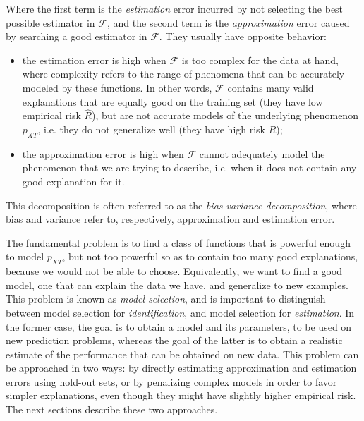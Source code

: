 \documentclass[12pt]{book}
\begin{document}
Where the first term is the \emph{estimation} error incurred by not selecting the best possible estimator in $\mathcal{F}$, and the second term is the \emph{approximation} error caused by searching a good estimator in $\mathcal{F}$. They usually have opposite behavior:

\begin{itemize}
\item the estimation error is high when $\mathcal{F}$ is too complex for the data at hand, where complexity refers to the range of phenomena that can be accurately modeled by these functions. In other words, $\mathcal{F}$ contains many valid explanations that are equally good on the training set (they have low empirical risk $\hat{R}$), but are not accurate models of the underlying phenomenon $p_{XT}$, i.e. they do not generalize well (they have high risk $R$);
\item the approximation error is high when $\mathcal{F}$ cannot adequately model the phenomenon that we are trying to describe, i.e. when it does not contain any good explanation for it.
\end{itemize}

This decomposition is often referred to as the \emph{bias-variance decomposition}, where bias and variance refer to, respectively, approximation and estimation error.

The fundamental problem is to find a class of functions that is powerful enough to model $p_{XT}$, but not too powerful so as to contain too many good explanations, because we would not be able to choose. Equivalently, we want to find a good model, one that can explain the data we have, and generalize to new examples. This problem is known as \emph{model selection}, and is important to distinguish between model selection for \emph{identification}, and model selection for \emph{estimation}. In the former case, the goal is to obtain a model and its parameters, to be used on new prediction problems, whereas the goal of the latter is to obtain a realistic estimate of the performance that can be obtained on new data. This problem can be approached in two ways: by directly estimating approximation and estimation errors using hold-out sets, or by penalizing complex models in order to favor simpler explanations, even though they might have slightly higher empirical risk. The next sections describe these two approaches.
\end{document}
